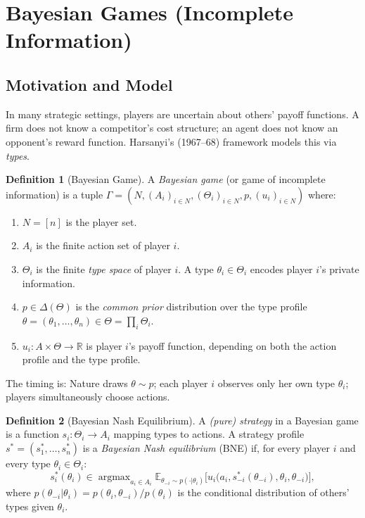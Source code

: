 \documentclass[11pt,a4paper]{article}
\theoremstyle{definition}
\newtheorem{definition}{Definition}[section]
\theoremstyle{plain}
\theoremstyle{remark}
\newcommand{\R}{\mathbb{R}}
\newcommand{\E}{\mathbb{E}}
\DeclareMathOperator{\argmax}{argmax}
\begin{document}
\section{Bayesian Games (Incomplete Information)}
\label{sec:bayesian-games}

\subsection{Motivation and Model}

In many strategic settings, players are uncertain about others' payoff functions. A firm
does not know a competitor's cost structure; an agent does not know an opponent's reward
function. Harsanyi's (1967--68) framework models this via \emph{types}.

\begin{definition}[Bayesian Game]
\label{def:bayesian-game}
A \emph{Bayesian game} (or game of incomplete information) is a tuple
$\Gamma = (N, (A_i)_{i \in N}, (\Theta_i)_{i \in N}, p, (u_i)_{i \in N})$ where:
\begin{enumerate}[label=(\alph*)]
    \item $N = [n]$ is the player set.
    \item $A_i$ is the finite action set of player $i$.
    \item $\Theta_i$ is the finite \emph{type space} of player $i$. A type
    $\theta_i \in \Theta_i$ encodes player $i$'s private information.
    \item $p \in \Delta(\Theta)$ is the \emph{common prior} distribution over the type
    profile $\theta = (\theta_1, \ldots, \theta_n) \in \Theta = \prod_i \Theta_i$.
    \item $u_i : A \times \Theta \to \R$ is player $i$'s payoff function, depending on both
    the action profile and the type profile.
\end{enumerate}
The timing is: Nature draws $\theta \sim p$; each player $i$ observes only her own type
$\theta_i$; players simultaneously choose actions.
\end{definition}

\begin{definition}[Bayesian Nash Equilibrium]
\label{def:bne}
A \emph{(pure) strategy} in a Bayesian game is a function $s_i : \Theta_i \to A_i$ mapping
types to actions. A strategy profile $s^* = (s_1^*, \ldots, s_n^*)$ is a \emph{Bayesian
Nash equilibrium} (BNE) if, for every player $i$ and every type $\theta_i \in \Theta_i$:
\[
    s_i^*(\theta_i) \in \argmax_{a_i \in A_i}
    \E_{\theta_{-i} \sim p(\cdot | \theta_i)}\bigl[
    u_i\bigl(a_i, s_{-i}^*(\theta_{-i}), \theta_i, \theta_{-i}\bigr)\bigr],
\]
where $p(\theta_{-i} | \theta_i) = p(\theta_i, \theta_{-i}) / p(\theta_i)$ is the
conditional distribution of others' types given $\theta_i$.
\end{definition}
\end{document}

